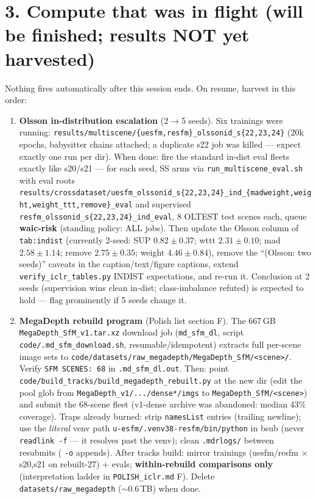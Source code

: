 \documentclass[11pt]{article}
\newcommand{\code}[1]{\texttt{\small #1}}
\begin{document}
\section*{3. Compute that was in flight (will be finished; results NOT yet harvested)}

Nothing fires automatically after this session ends. On resume, harvest in this order:

\begin{enumerate}[leftmargin=1.6em,itemsep=3pt]
\item \textbf{Olsson in-distribution escalation} (2$\rightarrow$5 seeds). Six trainings were
running: \code{results/multiscene/\{uesfm,resfm\}\_olssonid\_s\{22,23,24\}} (20k epochs, babysitter
chains attached; a duplicate s22 job was killed — expect exactly one run per dir).
When done: fire the standard in-dist eval fleets exactly like s20/s21 — for each seed,
SS arms via \code{run\_multiscene\_eval.sh} with eval roots
\code{results/crossdataset/uesfm\_olssonid\_s\{22,23,24\}\_ind\_\{madweight,weight,weight\_ttt,remove\}\_eval}
and supervised \code{resfm\_olssonid\_s\{22,23,24\}\_ind\_eval}, 8 OLTEST test scenes each, queue
\textbf{waic-risk} (standing policy: ALL jobs). Then update the Olsson column of
\code{tab:indist} (currently 2-seed: SUP $0.82\pm0.37$; wttt $2.31\pm0.10$; mad $2.58\pm1.14$;
remove $2.75\pm0.35$; weight $4.46\pm0.84$), remove the ``(Olsson: two seeds)'' caveats in the
caption/text/figure captions, extend \code{verify\_iclr\_tables.py} INDIST expectations, and
re-run it. Conclusion at 2 seeds (supervision wins clean in-dist; class-imbalance refuted)
is expected to hold — flag prominently if 5 seeds change it.
\item \textbf{MegaDepth rebuild program} (Polish list section F). The 667\,GB
\code{MegaDepth\_SfM\_v1.tar.xz} download job (\code{md\_sfm\_dl}, script
\code{code/.md\_sfm\_download.sh}, resumable/idempotent) extracts full per-scene image sets to
\code{code/datasets/raw\_megadepth/MegaDepth\_SfM/<scene>/}. Verify
\code{SFM SCENES: 68} in \code{.md\_sfm\_dl.out}. Then: point
\code{code/build\_tracks/build\_megadepth\_rebuilt.py} at the new dir (edit the pool glob from
\code{MegaDepth\_v1/.../dense*/imgs} to \code{MegaDepth\_SfM/<scene>}) and submit the 68-scene
fleet (v1-dense archive was abandoned: median 43\% coverage). Traps already burned: strip
\code{namesList} entries (trailing newline); use the \emph{literal} venv path
\code{u-esfm/.venv38-resfm/bin/python} in bsub (never \code{readlink -f} — it resolves past the
venv); clean \code{.mdrlogs/} between resubmits ( \code{-o} appends). After tracks build:
mirror trainings (uesfm/resfm $\times$ s20,s21 on rebuilt-27) + evals;
\textbf{within-rebuild comparisons only} (interpretation ladder in \code{POLISH\_iclr.md} F).
Delete \code{datasets/raw\_megadepth} ($\sim$0.6\,TB) when done.
\end{enumerate}
\end{document}
